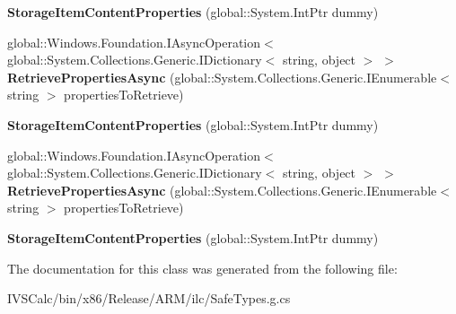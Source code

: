 \begin{DoxyCompactItemize}
\item 
\mbox{\label{class_windows_1_1_storage_1_1_file_properties_1_1_storage_item_content_properties_a0e9bb93cf75c95a12b228b31c6bc3c37}} 
{\bfseries Storage\+Item\+Content\+Properties} (global\+::\+System.\+Int\+Ptr dummy)
\item 
\mbox{\label{class_windows_1_1_storage_1_1_file_properties_1_1_storage_item_content_properties_a49d199409f2548b26e524874e512ac0c}} 
global\+::\+Windows.\+Foundation.\+I\+Async\+Operation$<$ global\+::\+System.\+Collections.\+Generic.\+I\+Dictionary$<$ string, object $>$ $>$ {\bfseries Retrieve\+Properties\+Async} (global\+::\+System.\+Collections.\+Generic.\+I\+Enumerable$<$ string $>$ properties\+To\+Retrieve)
\item 
\mbox{\label{class_windows_1_1_storage_1_1_file_properties_1_1_storage_item_content_properties_a0e9bb93cf75c95a12b228b31c6bc3c37}} 
{\bfseries Storage\+Item\+Content\+Properties} (global\+::\+System.\+Int\+Ptr dummy)
\item 
\mbox{\label{class_windows_1_1_storage_1_1_file_properties_1_1_storage_item_content_properties_a49d199409f2548b26e524874e512ac0c}} 
global\+::\+Windows.\+Foundation.\+I\+Async\+Operation$<$ global\+::\+System.\+Collections.\+Generic.\+I\+Dictionary$<$ string, object $>$ $>$ {\bfseries Retrieve\+Properties\+Async} (global\+::\+System.\+Collections.\+Generic.\+I\+Enumerable$<$ string $>$ properties\+To\+Retrieve)
\item 
\mbox{\label{class_windows_1_1_storage_1_1_file_properties_1_1_storage_item_content_properties_a0e9bb93cf75c95a12b228b31c6bc3c37}} 
{\bfseries Storage\+Item\+Content\+Properties} (global\+::\+System.\+Int\+Ptr dummy)
\end{DoxyCompactItemize}


The documentation for this class was generated from the following file\+:\begin{DoxyCompactItemize}
\item 
I\+V\+S\+Calc/bin/x86/\+Release/\+A\+R\+M/ilc/Safe\+Types.\+g.\+cs\end{DoxyCompactItemize}

